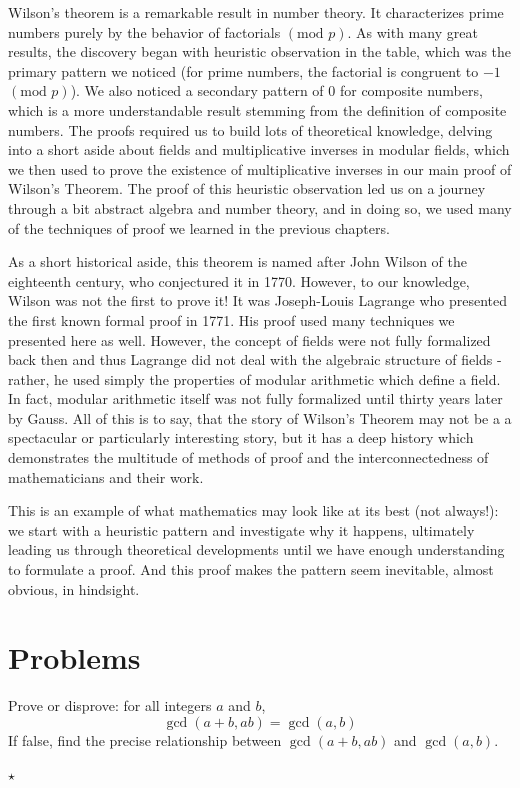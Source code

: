 Wilson's theorem is a remarkable result in number theory. It characterizes prime numbers purely by the behavior of factorials $(\text{mod }p)$. As with many great results, the discovery began with heuristic observation in the table, which was the primary pattern we noticed (for prime numbers, the factorial is congruent to $-1$ $(\text{mod }p)$). We also noticed a secondary pattern of $0$ for composite numbers, which is a more understandable result stemming from the definition of composite numbers. The proofs required us to build lots of theoretical knowledge, delving into a short aside about fields and multiplicative inverses in modular fields, which we then used to prove the existence of multiplicative inverses in our main proof of Wilson's Theorem. The proof of this heuristic observation led us on a journey through a bit abstract algebra and number theory, and in doing so, we used many of the techniques of proof we learned in the previous chapters. 

As a short historical aside, this theorem is named after John Wilson of the eighteenth century, who conjectured it in 1770. However, to our knowledge, Wilson was not the first to prove it! It was Joseph-Louis Lagrange who presented the first known formal proof in 1771. His proof used many techniques we presented here as well. However, the concept of fields were not fully formalized back then and thus Lagrange did not deal with the algebraic structure of fields - rather, he used simply the properties of modular arithmetic which define a field. In fact, modular arithmetic itself was not fully formalized until thirty years later by Gauss. All of this is to say, that the story of Wilson's Theorem may not be a a spectacular or particularly interesting story, but it has a deep history which demonstrates the multitude of methods of proof and the interconnectedness of mathematicians and their work.

This is an example of what mathematics may look like at its best (not always!): we start with a heuristic pattern and investigate why it happens, ultimately leading us through theoretical developments until we have enough understanding to formulate a proof. And this proof makes the pattern seem inevitable, almost obvious, in hindsight.

\section{Problems}

\begin{problem}
Prove or disprove: for all integers $a$ and $b$,
\[
\gcd(a+b, ab) = \gcd(a, b)
\]
If false, find the precise relationship between $\gcd(a+b, ab)$ and $\gcd(a, b)$. 

\hfill $\star$
\end{problem}

